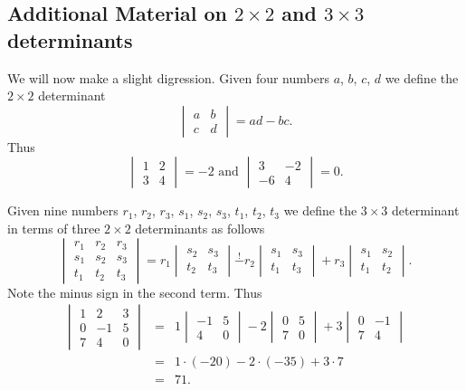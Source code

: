 \subsection*{Additional Material on $2 \times 2$ and $3 \times 3$ determinants}

We will now make a slight digression.  Given four numbers $a$, $b$, $c$, $d$ we define the $2 \times 2$ determinant
\[\begin{vmatrix}a & b \\ c & d\end{vmatrix} = ad - bc.\]
Thus
\[
\begin{vmatrix}1 & 2 \\3 & 4\end{vmatrix} = -2
\text{ and }
\begin{vmatrix}3 & -2 \\-6 & 4\end{vmatrix} = 0.
\]

Given nine numbers $r_1$, $r_2$, $r_3$, $s_1$, $s_2$, $s_3$, $t_1$, $t_2$, $t_3$ we define the $3 \times 3$ determinant in terms of three $2 \times 2$ determinants as follows
\[
\begin{vmatrix}r_1 & r_2 & r_3 \\s_1 & s_2 & s_3 \\t_1 & t_2 & t_3\end{vmatrix} 
=
r_1 \begin{vmatrix}s_2 & s_3 \\t_2 & t_3\end{vmatrix}
\stackrel{!}{-}r_2 \begin{vmatrix}s_1 & s_3 \\t_1 & t_3\end{vmatrix}
+r_3 \begin{vmatrix}s_1 & s_2 \\t_1 & t_2\end{vmatrix}.
\]
Note the minus sign in the second term.  Thus
\begin{eqnarray*}
\begin{vmatrix}1 & 2 & 3 \\0 & -1 & 5 \\7 & 4 & 0\end{vmatrix} 
& = &
1 \begin{vmatrix}-1 & 5 \\4 & 0\end{vmatrix}
-2 \begin{vmatrix}0 & 5 \\7 & 0\end{vmatrix}
+3 \begin{vmatrix}0 & -1 \\7 & 4\end{vmatrix} \\
 & = & 1 \cdot (-20) - 2 \cdot (-35) + 3 \cdot 7 \\
 & = & 71.
\end{eqnarray*}

